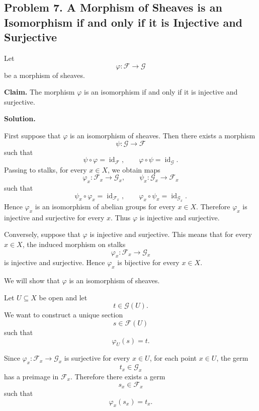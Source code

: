 
\subsection*{Problem 7. A Morphism of Sheaves is an Isomorphism if and only if it is Injective and Surjective}

Let
\[
\varphi:\mathcal{F} \longrightarrow \mathcal{G}
\]
be a morphism of sheaves.

\textbf{Claim.} The morphism \(\varphi\) is an isomorphism if and only if it is injective and surjective.

\textbf{Solution.}

First suppose that \(\varphi\) is an isomorphism of sheaves. Then there exists a morphism
\[
\psi:\mathcal{G}\longrightarrow \mathcal{F}
\]
such that
\[
\psi\circ \varphi=\operatorname{id}_{\mathcal{F}},
\qquad
\varphi\circ \psi=\operatorname{id}_{\mathcal{G}}.
\]
Passing to stalks, for every \(x\in X\), we obtain maps
\[
\varphi_x:\mathcal{F}_x\longrightarrow \mathcal{G}_x,
\qquad
\psi_x:\mathcal{G}_x\longrightarrow \mathcal{F}_x
\]
such that
\[
\psi_x\circ \varphi_x=\operatorname{id}_{\mathcal{F}_x},
\qquad
\varphi_x\circ \psi_x=\operatorname{id}_{\mathcal{G}_x}.
\]
Hence \(\varphi_x\) is an isomorphism of abelian groups for every \(x\in X\). Therefore \(\varphi_x\) is injective and surjective for every \(x\). Thus \(\varphi\) is injective and surjective.

Conversely, suppose that \(\varphi\) is injective and surjective. This means that for every \(x\in X\), the induced morphism on stalks
\[
\varphi_x:\mathcal{F}_x\longrightarrow \mathcal{G}_x
\]
is injective and surjective. Hence \(\varphi_x\) is bijective for every \(x\in X\).

We will show that \(\varphi\) is an isomorphism of sheaves.

Let \(U\subseteq X\) be open and let
\[
t\in \mathcal{G}(U).
\]
We want to construct a unique section
\[
s\in \mathcal{F}(U)
\]
such that
\[
\varphi_U(s)=t.
\]

Since \(\varphi_x:\mathcal{F}_x\to \mathcal{G}_x\) is surjective for every \(x\in U\), for each point \(x\in U\), the germ
\[
t_x\in \mathcal{G}_x
\]
has a preimage in \(\mathcal{F}_x\). Therefore there exists a germ
\[
s_x\in \mathcal{F}_x
\]
such that
\[
\varphi_x(s_x)=t_x.
\]

